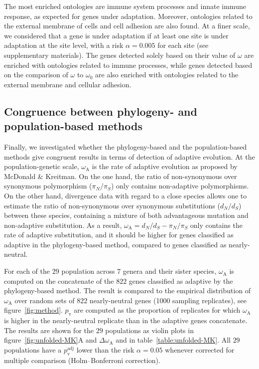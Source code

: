 \documentclass{article}
\newcommand{\dn}{d_N}
\newcommand{\ds}{d_S}
\newcommand{\dnds}{\dn / \ds}
\newcommand{\pn}{\pi_N}
\newcommand{\ps}{\pi_S}
\newcommand{\pnps}{\pn / \ps}
\begin{document}
    The most enriched ontologies are immune system processes and innate immune response, as expected for genes under adaptation.
    Moreover, ontologies related to the external membrane of cells and cell adhesion are also found.
    At a finer scale, we considered that a gene is under adaptation if at least one site is under adaptation at the site level, with a risk $\alpha=0.005$ for each site (see supplementary materials).
    The genes detected solely based on their value of $\omega$ are enriched with ontologies related to immune processes, while genes detected based on the comparison of $\omega$ to $\omega_{0}$ are also enriched with ontologies related to the external membrane and cellular adhesion.

    \subsection*{Congruence between phylogeny- and population-based methods}

    Finally, we investigated whether the phylogeny-based and the population-based methods give congruent results in terms of detection of adaptive evolution.
    At the population-genetic scale, $\omega_{\mathrm{A}}$ is the rate of adaptive evolution as proposed by McDonald \& Kreitman\cite{mcdonald_adaptative_1991}.
    On the one hand, the ratio of non-synonymous over synonymous polymorphism ($\pnps$) only contains non-adaptive polymorphisms.
    On the other hand, divergence data with regard to a close species allows one to estimate the ratio of non-synonymous over synonymous substitutions ($\dnds$) between these species, containing a mixture of both advantageous mutation and non-adaptive substitution.
    As a result, $\omega_{\mathrm{A}} = \dnds - \pnps$ only contains the rate of adaptive substitution, and it should be higher for genes classified as adaptive in the phylogeny-based method, compared to genes classified as nearly-neutral.

    For each of the $29$ population across $7$ genera and their sister species, $\omega_{\mathrm{A}}$ is computed on the concatenate of the $822$ genes classified as adaptive by the phylogeny-based method.
    The result is compared to the empirical distribution of $\omega_{\mathrm{A}}$ over random sets of $822$ nearly-neutral genes (1000 sampling replicates), see figure~\ref{fig:method}.
    $p_{\mathrm{v}}$ are computed as the proportion of replicates for which $\omega_{\mathrm{A}}$ is higher in the nearly-neutral replicate than in the adaptive genes concatenate.
    The results are shown for the $29$ populations as violin plots in figure~\ref{fig:unfolded-MK}A and $\Delta \omega_{\mathrm{A}}$ and in table~\ref{table:unfolded-MK}.
    All $29$ populations have a $p_{\mathrm{v}}^{\mathrm{adj}}$ lower than the risk $\alpha=0.05$ whenever corrected for multiple comparison (Holm–Bonferroni correction).
\end{document}
